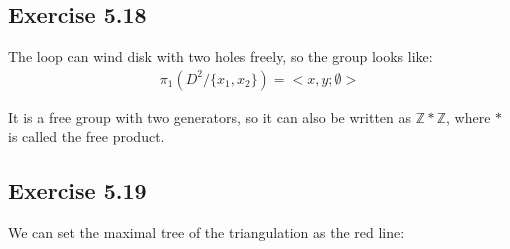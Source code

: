 \documentclass[]{ctexart}
\begin{document}
	\subsection{Exercise 5.18}
		The loop can wind disk with two holes freely, so the group looks like:
			\begin{equation*}
			\begin{aligned}
				\pi_1(D^2/\{x_1,x_2\})=<x,y;\emptyset>
			\end{aligned}
			\end{equation*}
		
		It is a free group with two generators, so it can also be written as $\mathbb{Z}*\mathbb{Z}$, where $*$ is called the free product. 
	
	\subsection{Exercise 5.19}
		We can set the maximal tree of the triangulation as the red line:
\end{document}
